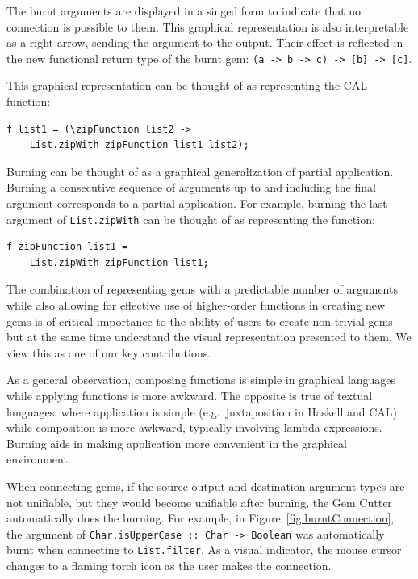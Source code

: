 \documentclass[preprint]{sigplanconf}
\begin{document}
The burnt arguments are displayed in a singed form to indicate that no
connection is possible to them. This graphical representation is also
interpretable as a right arrow, sending the argument to the
output. Their effect is reflected in the new functional return type of
the burnt gem: {\tt (a -> b -> c) -> [b] -> [c]}.

This graphical representation can be thought of as representing the CAL function:

\begin{verbatim}
f list1 = (\zipFunction list2 ->
    List.zipWith zipFunction list1 list2);
\end{verbatim}

Burning can be thought of as a graphical generalization of partial
application. Burning a consecutive sequence of arguments up to and
including the final argument corresponds to a partial application. For
example, burning the last argument of {\tt List.zipWith} can be
thought of as representing the function:

\begin{verbatim}
f zipFunction list1 =
    List.zipWith zipFunction list1;
\end{verbatim}

The combination of representing gems with a predictable number of
arguments while also allowing for effective use of higher-order
functions in creating new gems is of critical importance to the
ability of users to create non-trivial gems but at the same time
understand the visual representation presented to them. We view this
as one of our key contributions.

As a general observation, composing functions is simple in graphical
languages while applying functions is more awkward. The opposite is
true of textual languages, where application is simple
(e.g.\ juxtaposition in Haskell and CAL) while composition is more
awkward, typically involving lambda expressions. Burning aids in
making application more convenient in the graphical environment.

When connecting gems, if the source output and destination argument
types are not unifiable, but they would become unifiable after
burning, the Gem Cutter automatically does the burning. For example, in Figure~\ref{fig:burntConnection}, 
the argument of {\tt Char.isUpperCase :: Char -> Boolean} was
automatically burnt when connecting to {\tt List.filter}. As a visual
indicator, the mouse cursor changes to a flaming torch icon
as the user makes the connection.
\end{document}
